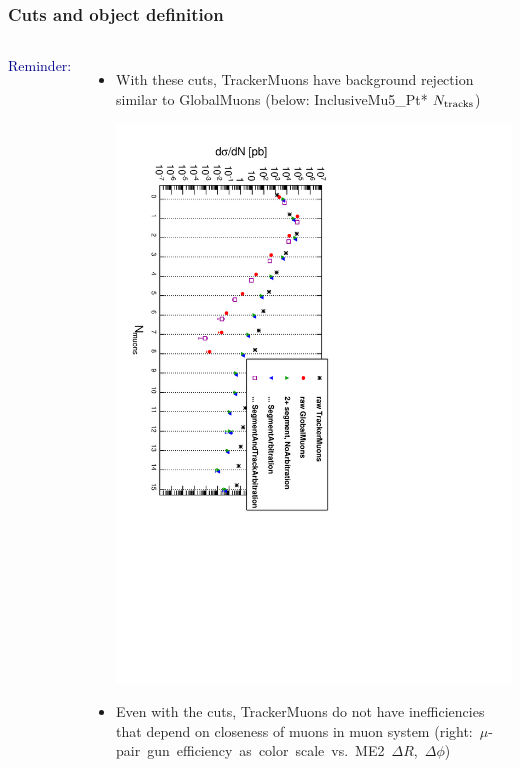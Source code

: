 \documentclass[compress]{beamer}
\newcommand{\s}[1]{{\mbox{\scriptsize #1}}}
\begin{document}
\begin{frame}
\frametitle{Cuts and object definition}
\begin{columns}
\textcolor{darkblue}{\large Reminder:}

\begin{itemize}
\item With these cuts, TrackerMuons have background rejection similar
  to GlobalMuons (below: InclusiveMu5\_Pt* $N_\s{tracks}$)

\includegraphics[height=\linewidth, angle=90]{tracks_lastpage_allreal.pdf}

\item Even with the cuts, TrackerMuons do not have inefficiencies that
  depend on closeness of muons in muon system \mbox{(right: $\mu$-pair gun efficiency as color scale vs.\ ME2 $\Delta R$, $\Delta \phi$)\hspace{-7 cm}}


\end{itemize}
\end{columns}
\end{frame}
\end{document}
